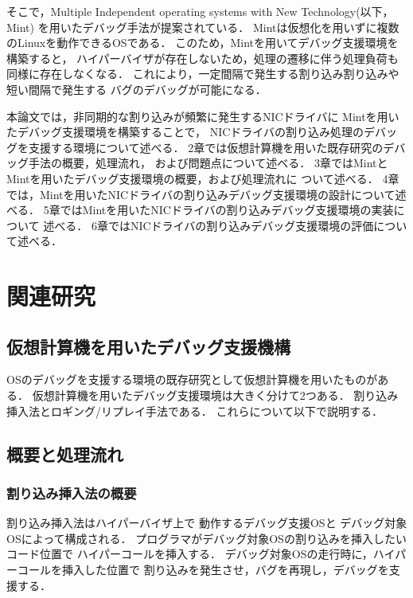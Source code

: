 \documentclass[tanilab-enum]{graduate}
\begin{document}
そこで，Multiple Independent operating systems with New Technology(以下，Mint)\cite{senzaki}
を用いたデバッグ手法が提案されている．
Mintは仮想化を用いずに複数のLinuxを動作できるOSである．
このため，Mintを用いてデバッグ支援環境を構築すると，
ハイパーバイザが存在しないため，処理の遷移に伴う処理負荷も
同様に存在しなくなる．
これにより，一定間隔で発生する割り込み割り込みや短い間隔で発生する
バグのデバッグが可能になる．

本論文では，非同期的な割り込みが頻繁に発生するNICドライバに
Mintを用いたデバッグ支援環境を構築することで，
NICドライバの割り込み処理のデバッグを支援する環境について述べる．
2章では仮想計算機を用いた既存研究のデバッグ手法の概要，処理流れ，
および問題点について述べる．
3章ではMintとMintを用いたデバッグ支援環境の概要，および処理流れに
ついて述べる．
4章では，Mintを用いたNICドライバの割り込みデバッグ支援環境の設計について述べる．
5章ではMintを用いたNICドライバの割り込みデバッグ支援環境の実装について
述べる．
6章ではNICドライバの割り込みデバッグ支援環境の評価について述べる．
\chapter{関連研究}\label{chap:kanren}
\section{仮想計算機を用いたデバッグ支援機構}
OSのデバッグを支援する環境の既存研究として仮想計算機を用いたものがある．
仮想計算機を用いたデバッグ支援環境は大きく分けて2つある．
割り込み挿入法とロギング/リプレイ手法である．
これらについて以下で説明する．
\section{概要と処理流れ}
    \subsection{割り込み挿入法の概要}
    割り込み挿入法\cite{miyahara}はハイパーバイザ上で
    動作するデバッグ支援OSと
    デバッグ対象OSによって構成される．
    プログラマがデバッグ対象OSの割り込みを挿入したいコード位置で
    ハイパーコールを挿入する．
    デバッグ対象OSの走行時に，ハイパーコールを挿入した位置で
    割り込みを発生させ，バグを再現し，デバッグを支援する．
\end{document}
